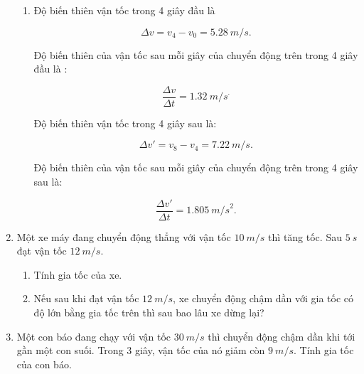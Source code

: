 \begin{enumerate}[label=\bfseries Bài \arabic*:]
{\begin{enumerate}[label=\alph*)]
			$$\Delta v = v_8 - v_0 = \SI{45}{km/h}.$$
			\item Độ biến thiên vận tốc trong 4 giây đầu là
			
			$$\Delta v = v_4 - v_0 = \SI{5,28}{m/s}.$$
			
			Độ biến thiên của vận tốc sau mỗi giây của chuyển động trên trong 4 giây đầu là :
			
			$$\dfrac{\Delta v}{\Delta t} = \SI{1,32}{m/s}^.$$
			
			Độ biến thiên vận tốc trong 4 giây sau là: 
			
			$$\Delta v' = v_8 - v_4 =\SI{7,22}{m/s}.$$
			
			Độ biến thiên của vận tốc sau mỗi giây của chuyển động trên trong 4 giây sau là:
			
			$$\dfrac{\Delta v'}{\Delta t} = \SI{1,805}{m/s}^2.$$ 
		\end{enumerate}
	}
	\item {}
	
	{
		Một xe máy đang chuyển động thẳng với vận tốc $\SI{10}{m/s}$ thì tăng tốc. Sau $\SI{5}{s}$ đạt vận tốc $\SI{12}{m/s}.$
		
		\begin{enumerate}[label=\alph*)]
			\item Tính gia tốc của xe.
			\item Nếu sau khi đạt vận tốc $\SI{12}{m/s}$, xe chuyển động chậm dần với gia tốc có độ lớn bằng gia tốc trên thì sau bao lâu xe dừng lại?
		\end{enumerate}
	}

	\item {}
	
	{
		
		Một con báo đang chạy với vận tốc $\SI{30}{m/s}$ thì chuyển động chậm dần khi tới gần một con suối. Trong 3 giây, vận tốc của nó giảm còn $\SI{9}{m/s}$. Tính gia tốc của con báo.
	}
	\hideall{
		
}
\end{enumerate}
